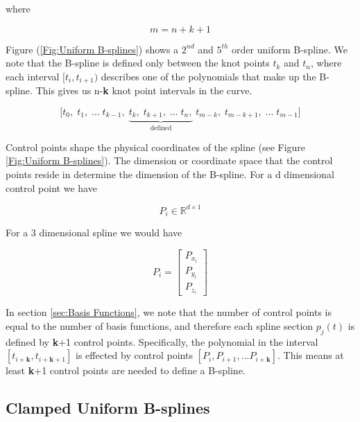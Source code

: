 \documentclass{article}
\begin{document}
where 

\begin{equation}
    m = n + k + 1
\end{equation}

Figure (\ref{Fig:Uniform B-splines}) shows a \(2^{nd}\) and \(5^{th}\) order uniform B-spline. We note that the B-spline is defined only between the knot points \(t_k\) and \(t_n\), where each interval \([t_i , t_{i+1})\) describes one of the polynomials that make up the B-spline. This gives us n-\textbf{k} knot point intervals in the curve.

\begin{equation}
    \Big[ t_0, \; t_1,  \; ... \; t_{k-1} , \; \underbrace{t_k, \; t_{k+1}, \; ... \; t_n,}_{\text{defined}} \; t_{m-k}, \; t_{m-k+1}, \; ... \; t_{m-1} \Big]
\end{equation}

Control points shape the physical coordinates of the spline (see Figure \ref{Fig:Uniform B-splines}). The dimension or coordinate space that the control points reside in determine the dimension of the B-spline. For a d dimensional control point we have
 
 \begin{equation}
     P_i \in \mathbb{R}^{d \times 1}
 \end{equation}
 
For a 3 dimensional spline we would have
 
  \begin{equation}
     P_i = \begin{bmatrix} P_{x_i} \\ P_{y_i} \\ P_{z_i} \end{bmatrix}
 \end{equation}
 
In section \ref{sec:Basis Functions}, we note that the number of control points is equal to the number of basis functions, and therefore each spline section \(p_j(t)\) is defined by \textbf{k}+1 control points. Specifically, the polynomial in the interval \([t_{i+\textbf{k}} , t_{i+\textbf{k}+1}]\) is effected by control points \([P_i , P_{i+1}, ... P_{i+\textbf{k}}]\). This means at least \textbf{k}+1 control points are needed to define a B-spline.

\subsection{Clamped Uniform B-splines}
\end{document}
